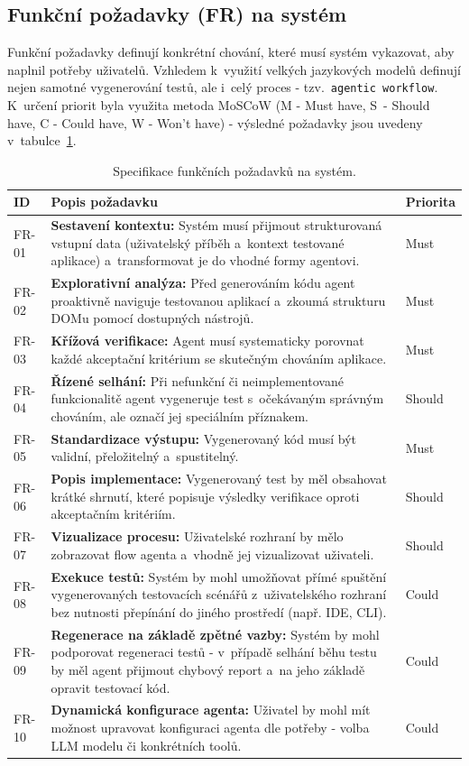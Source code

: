 \documentclass[czech, ing, kiv, he, iso690numb, viewonly]{fasthesis}
\begin{document}
\subsection{Funkční požadavky (FR) na systém}
Funkční požadavky definují konkrétní chování, které musí systém vykazovat, aby naplnil potřeby uživatelů. 
Vzhledem k~využití velkých jazykových modelů definují nejen samotné vygenerování testů, ale i~celý proces - tzv.~\texttt{agentic workflow}. K~určení priorit byla využita metoda MoSCoW (M - Must have, S~- Should have, C - Could have, W - Won't have) -
výsledné požadavky jsou uvedeny v~tabulce~\ref{tab:functional_req}.

\begin{table}[H]
\centering
\begin{tabular}{|l|p{8cm}|l|}
\hline
\textbf{ID} & \textbf{Popis požadavku} & \textbf{Priorita} \\ \hline
FR-01 & \textbf{Sestavení kontextu:} Systém musí přijmout strukturovaná vstupní data (uživatelský příběh a~kontext testované aplikace) a~transformovat je do vhodné formy agentovi. & Must \\ \hline
FR-02 & \textbf{Explorativní analýza:} Před generováním kódu agent proaktivně naviguje testovanou aplikací a~zkoumá strukturu DOMu pomocí dostupných nástrojů. & Must \\ \hline
FR-03 & \textbf{Křížová verifikace:} Agent musí systematicky porovnat každé akceptační kritérium se skutečným chováním aplikace. & Must \\ \hline
FR-04 & \textbf{Řízené selhání:} Při nefunkční či neimplementované funkcionalitě agent vygeneruje test s~očekávaným správným chováním, ale označí jej speciálním příznakem. & Should \\ \hline
FR-05 & \textbf{Standardizace výstupu:} Vygenerovaný kód musí být validní, přeložitelný a~spustitelný. & Must \\ \hline
FR-06 & \textbf{Popis implementace:} Vygenerovaný test by měl obsahovat krátké shrnutí, které popisuje výsledky verifikace oproti akceptačním kritériím. & Should \\ \hline
FR-07 & \textbf{Vizualizace procesu:} Uživatelské rozhraní by mělo zobrazovat flow agenta a~vhodně jej vizualizovat uživateli. & Should \\ \hline
FR-08 & \textbf{Exekuce testů:} Systém by mohl umožňovat přímé spuštění vygenerovaných testovacích scénářů z~uživatelského rozhraní bez nutnosti přepínání do jiného prostředí (např. IDE, CLI). & Could \\ \hline
FR-09 & \textbf{Regenerace na základě zpětné vazby:} Systém by mohl podporovat regeneraci testů - v~případě selhání běhu testu by měl agent přijmout chybový report a~na jeho základě opravit testovací kód. & Could \\ \hline
FR-10 & \textbf{Dynamická konfigurace agenta:} Uživatel by mohl mít možnost upravovat konfiguraci agenta dle potřeby - volba LLM modelu či konkrétních toolů. & Could \\ \hline
\end{tabular}
\caption{Specifikace funkčních požadavků na systém.}
\label{tab:functional_req}
\end{table}
\end{document}
